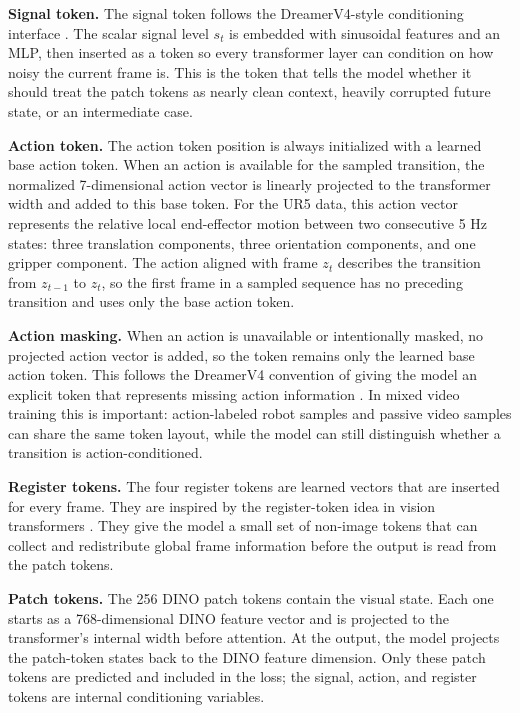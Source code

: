 \documentclass[12pt]{report}
\begin{document}
\noindent\textbf{Signal token.}
The signal token follows the DreamerV4-style conditioning interface \cite{hafner2025dreamerv4}. The scalar signal level $s_t$ is embedded with sinusoidal features and an MLP, then inserted as a token so every transformer layer can condition on how noisy the current frame is. This is the token that tells the model whether it should treat the patch tokens as nearly clean context, heavily corrupted future state, or an intermediate case.

\noindent\textbf{Action token.}
The action token position is always initialized with a learned base action token. When an action is available for the sampled transition, the normalized 7-dimensional action vector is linearly projected to the transformer width and added to this base token. For the UR5 data, this action vector represents the relative local end-effector motion between two consecutive 5 Hz states: three translation components, three orientation components, and one gripper component. The action aligned with frame $z_t$ describes the transition from $z_{t-1}$ to $z_t$, so the first frame in a sampled sequence has no preceding transition and uses only the base action token.

\noindent\textbf{Action masking.}
When an action is unavailable or intentionally masked, no projected action vector is added, so the token remains only the learned base action token. This follows the DreamerV4 convention of giving the model an explicit token that represents missing action information \cite{hafner2025dreamerv4}. In mixed video training this is important: action-labeled robot samples and passive video samples can share the same token layout, while the model can still distinguish whether a transition is action-conditioned.

\noindent\textbf{Register tokens.}
The four register tokens are learned vectors that are inserted for every frame. They are inspired by the register-token idea in vision transformers \cite{darcet2023registers}. They give the model a small set of non-image tokens that can collect and redistribute global frame information before the output is read from the patch tokens.

\noindent\textbf{Patch tokens.}
The 256 DINO patch tokens contain the visual state. Each one starts as a 768-dimensional DINO feature vector and is projected to the transformer's internal width before attention. At the output, the model projects the patch-token states back to the DINO feature dimension. Only these patch tokens are predicted and included in the loss; the signal, action, and register tokens are internal conditioning variables.
\end{document}

